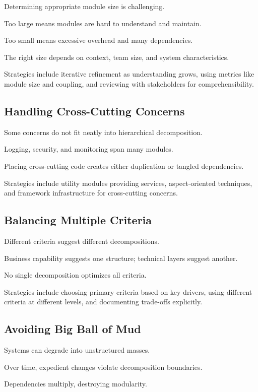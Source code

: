\documentclass[11pt]{article}
\begin{document}
Determining appropriate module size is challenging.

Too large means modules are hard to understand and maintain.

Too small means excessive overhead and many dependencies.

The right size depends on context, team size, and system characteristics.

Strategies include iterative refinement as understanding grows, using metrics like module size and coupling, and reviewing with stakeholders for comprehensibility.

\subsection{Handling Cross-Cutting Concerns}

Some concerns do not fit neatly into hierarchical decomposition.

Logging, security, and monitoring span many modules.

Placing cross-cutting code creates either duplication or tangled dependencies.

Strategies include utility modules providing services, aspect-oriented techniques, and framework infrastructure for cross-cutting concerns.

\subsection{Balancing Multiple Criteria}

Different criteria suggest different decompositions.

Business capability suggests one structure; technical layers suggest another.

No single decomposition optimizes all criteria.

Strategies include choosing primary criteria based on key drivers, using different criteria at different levels, and documenting trade-offs explicitly.

\subsection{Avoiding Big Ball of Mud}

Systems can degrade into unstructured masses.

Over time, expedient changes violate decomposition boundaries.

Dependencies multiply, destroying modularity.
\end{document}
